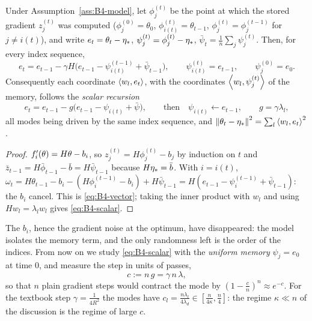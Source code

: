 \begin{lemma}[reduction]\label{lem:B4-reduction}
Under Assumption~\ref{ass:B4-model}, let $\phi_j^{(t)}$ be the point at which the stored gradient $z_j^{(t)}$ was computed ($\phi_j^{(0)}=\theta_0$, $\phi^{(t)}_{i(t)}=\theta_{t-1}$, $\phi_j^{(t)}=\phi_j^{(t-1)}$ for $j\ne i(t)$), and write $e_t=\theta_t-\eta_\ast$, $\psi^{(t)}_j=\phi^{(t)}_j-\eta_\ast$, $\bar\psi_t=\frac1n\sum_j\psi_j^{(t)}$. Then, for every index sequence,
\begin{equation}\label{eq:B4-vector}
e_t=e_{t-1}-\gamma H\big(e_{t-1}-\psi^{(t-1)}_{i(t)}+\bar\psi_{t-1}\big),\qquad \psi^{(t)}_{i(t)}=e_{t-1},\qquad \psi_j^{(0)}=e_0 .
\end{equation}
Consequently each coordinate $\left\langle w_l, e_t \right\rangle$, with the coordinates $\left\langle w_l, \psi^{(t)}_j \right\rangle$ of the memory, follows the \emph{scalar recursion}
\begin{equation}\label{eq:B4-scalar}
e_t=e_{t-1}-g\big(e_{t-1}-\psi_{i(t)}+\bar\psi\big),\qquad\text{then}\quad \psi_{i(t)}\leftarrow e_{t-1},\qquad g=\gamma\lambda_l ,
\end{equation}
all modes being driven by the same index sequence, and $\left\|\theta_t-\eta_\ast\right\|^2=\sum_l\left\langle w_l, e_t \right\rangle^2$.
\end{lemma}
\begin{proof}
$f'_i(\theta)=H\theta-b_i$, so $z_j^{(t)}=H\phi_j^{(t)}-b_j$ by induction on $t$ and $\bar z_{t-1}=H\bar\phi_{t-1}-\bar b=H\bar\psi_{t-1}$ because $H\eta_\ast=\bar b$. With $i=i(t)$, $\omega_t=H\theta_{t-1}-b_i-(H\phi_i^{(t-1)}-b_i)+H\bar\psi_{t-1}=H(e_{t-1}-\psi_i^{(t-1)}+\bar\psi_{t-1})$: the $b_i$ cancel. This is \eqref{eq:B4-vector}; taking the inner product with $w_l$ and using $Hw_l=\lambda_lw_l$ gives \eqref{eq:B4-scalar}.
\end{proof}

The $b_i$, hence the gradient noise at the optimum, have disappeared: the model isolates the memory term, and the only randomness left is the order of the indices. From now on we study \eqref{eq:B4-scalar} with the \emph{uniform memory} $\psi_j=e_0$ at time $0$, and measure the step in units of passes,
\[
c:=n\,g=\gamma\,n\,\lambda ,
\]
so that $n$ plain gradient steps would contract the mode by $(1-\frac cn)^n\approx e^{-c}$. For the textbook step $\gamma=\frac1{4R^2}$ the modes have $c_l=\frac{n\lambda_l}{4\lambda_d}\in[\frac n{4\kappa},\frac n4]$: the regime $\kappa\ll n$ of the discussion is the regime of large $c$.

